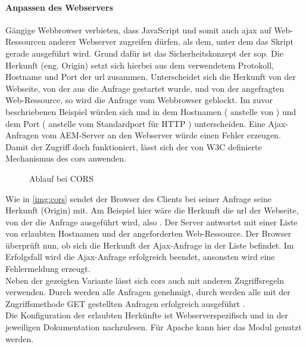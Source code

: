 \paragraph{Anpassen des Webservers}
\label{sec:anpassen-des-webservers}
Gängige Webbrowser verbieten, dass JavaScript und somit auch \ac{ajax} auf Web-Ressourcen anderer Webserver zugreifen dürfen, als dem, unter dem das Skript gerade ausgeführt wird. Grund dafür ist das Sicherheitskonzept der \acf{sop}. Die Herkunft (eng. Origin) setzt sich hierbei aus dem verwendetem Protokoll, Hostname und Port der \ac{url} zusammen. Unterscheidet sich die Herkunft von der Webseite, von der aus die Anfrage gestartet wurde, und von der angefragten Web-Ressource, so wird die Anfrage vom Webbrowser geblockt. Im zuvor beschriebenen Beispiel würden sich \serverA und \serverB in dem Hostnamen ( anstelle von ) und dem Port ( anstelle vom Standardport für HTTP ) unterscheiden. Eine Ajax-Anfragen vom AEM-Server an den Webserver würde einen Fehler erzeugen.\\
Damit der Zugriff doch funktioniert, lässt sich der von W3C definierte Mechanismus des \ac{cors} anwenden.

\begin{figure}[H]
	\begin{center}
		
		\caption{Ablauf bei CORS}
		\label{img:cors}
	\end{center}
\end{figure}
Wie in \autoref{img:cors} sendet der Browser des Clients bei seiner Anfrage seine Herkunft (Origin) mit. Am Beispiel hier wäre die Herkunft die \ac{url} der Webseite, von der die Anfrage ausgeführt wird, also \serverAN. Der Server antwortet mit einer Liste von erlaubten Hostnamen und der angeforderten Web-Ressource. Der Browser überprüft nun, ob sich die Herkunft der Ajax-Anfrage in der Liste befindet. Im Erfolgsfall wird die Ajax-Anfrage erfolgreich beendet, ansonsten wird eine Fehlermeldung erzeugt. \\
Neben der gezeigten Variante lässt sich \ac{cors} auch mit anderen Zugriffsregeln verwenden. Durch  werden alle Anfragen genehmigt, durch  werden alle mit der Zugriffsmethode GET gestellten Anfragen erfolgreich ausgeführt \cite{W3C2014a}. \\
Die Konfiguration der erlaubten Herkünfte ist Webserverspezifisch und in der jeweiligen Dokumentation nachzulesen. Für Apache kann hier das Modul  \cite{Foundation2017} genutzt werden.